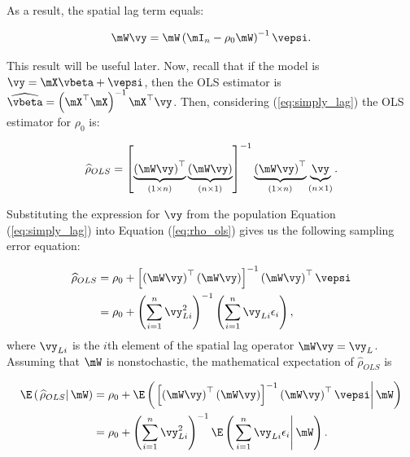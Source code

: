 \documentclass[english,12pt]{book}\usepackage[]{graphicx}\usepackage[]{xcolor}
\begin{document}
As a result, the spatial lag term equals:

\begin{equation}\label{eq:wy_pure}
  \mW\vy = \mW\left(\mI_n - \rho_0\mW\right)^{-1}\vepsi.
\end{equation}

This result will be useful later. Now, recall that if the model is $\vy = \mX\vbeta + \vepsi$, then the OLS estimator is $\widehat{\vbeta} = \left(\mX^\top\mX\right)^{-1}\mX^\top\vy$. Then, considering (\ref{eq:simply_lag}) the OLS estimator for $\rho_0$ is: 

\begin{equation}\label{eq:rho_ols}
\widehat{\rho}_{OLS} = \left[\underbrace{\left(\mW\vy \right)^\top}_{(1\times n)}\underbrace{\left(\mW\vy \right)}_{(n\times 1)}\right]^{-1}\underbrace{\left(\mW\vy \right)^\top}_{(1\times n)}\underbrace{\vy}_{(n\times 1)}.
\end{equation}

Substituting the expression for $\vy$ from the population Equation (\ref{eq:simply_lag}) into Equation (\ref{eq:rho_ols}) gives us the following sampling error equation:

\begin{equation*}
  \begin{aligned}
          \widehat{\rho}_{OLS} & = \rho_0 + \left[\left(\mW\vy \right)^\top\left(\mW\vy \right)\right]^{-1}\left(\mW\vy \right)^\top\vepsi \\
                               & = \rho_0 + \left(\sum_{i = 1}^n \vy_{Li}^2\right)^{-1}\left(\sum_{i = 1}^{n}\vy_{Li}\epsilon_i\right),
  \end{aligned}
\end{equation*}
%
where $\vy_{Li}$ is the $i$th element of the spatial lag operator $\mW\vy = \vy_L$. Assuming that $\mW$ is nonstochastic, the mathematical expectation of $\widehat{\rho}_{OLS}$ is

\begin{equation}\label{eq:expectation_of_pureslm}
  \begin{aligned}
\E\left(\left.\widehat{\rho}_{OLS}\right| \mW\right) & = \rho_0 + \E\left(\left.\left[\left(\mW\vy \right)^\top\left(\mW\vy \right)\right]^{-1}\left(\mW\vy \right)^\top\vepsi\right| \mW \right) \\
                         & = \rho_0 + \left(\sum_{i = 1}^n \vy_{Li}^2\right)^{-1}\E\left(\left.\sum_{i = 1}^{n}\vy_{Li}\epsilon_i\right| \mW\right).
  \end{aligned}
\end{equation}
\end{document}
